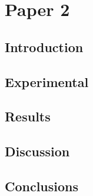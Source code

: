 


\chapter{Paper 2}

\section{Introduction}
\lipsum

\section{Experimental}
\lipsum

\section{Results}
\lipsum

\section{Discussion}
\lipsum

\section{Conclusions}
\lipsum
